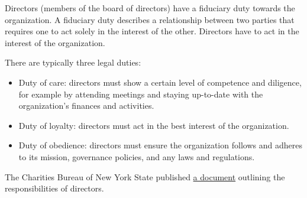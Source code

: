 \begin{kaobox}[frametitle=Director responsibilities]

Directors (members of the board of directors) have a fiduciary duty towards the organization.  A fiduciary duty describes a relationship between two parties that requires one to act solely in the interest of the other.  Directors have to act in the interest of the organization.

There are typically three legal duties:

\begin{itemize}

\item Duty of care: directors must show a certain level of competence and diligence, for example by attending meetings and staying up-to-date with the organization's finances and activities.

\item Duty of loyalty: directors must act in the best interest of the organization.

\item Duty of obedience: directors must ensure the organization follows and adheres to its mission, governance policies, and any laws and regulations.

\end{itemize}

The Charities Bureau of New York State published \href{https://www.charitiesnys.com/pdfs/Right-From-the-Start.pdf}{a document} outlining the responsibilities of directors.

\end{kaobox}

